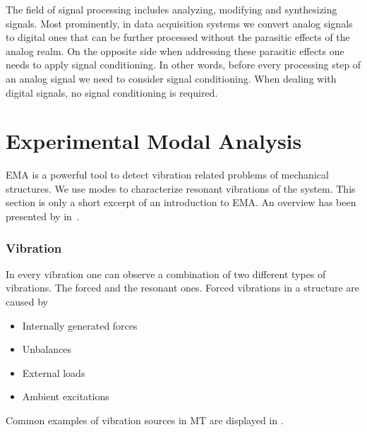 The field of signal processing includes analyzing, modifying and synthesizing signals. Most prominently, in data acquisition systems we convert analog signals to digital ones that can be further processed without the parasitic effects of the analog realm. On the opposite side when addressing these parasitic effects one needs to apply signal conditioning. In other words, before every processing step of an analog signal we need to consider signal conditioning. When dealing with digital signals, no signal conditioning is required.

\section{Experimental Modal Analysis}

\ac{EMA} is a powerful tool to detect vibration related problems of mechanical structures. We use modes to characterize resonant vibrations of the system. This section is only a short excerpt of an introduction to \ac{EMA}. An overview has been presented by \citeauthor{schwarz1999experimental} in~\cite{schwarz1999experimental}.

\subsubsection{Vibration}

In every vibration one can observe a combination of two different types of vibrations. The forced and the resonant ones. Forced vibrations in a structure are caused by
\begin{itemize}
  \item Internally generated forces
  \item Unbalances
  \item External loads
  \item Ambient excitations
\end{itemize}
Common examples of vibration sources in \ac{MT} are displayed in .

